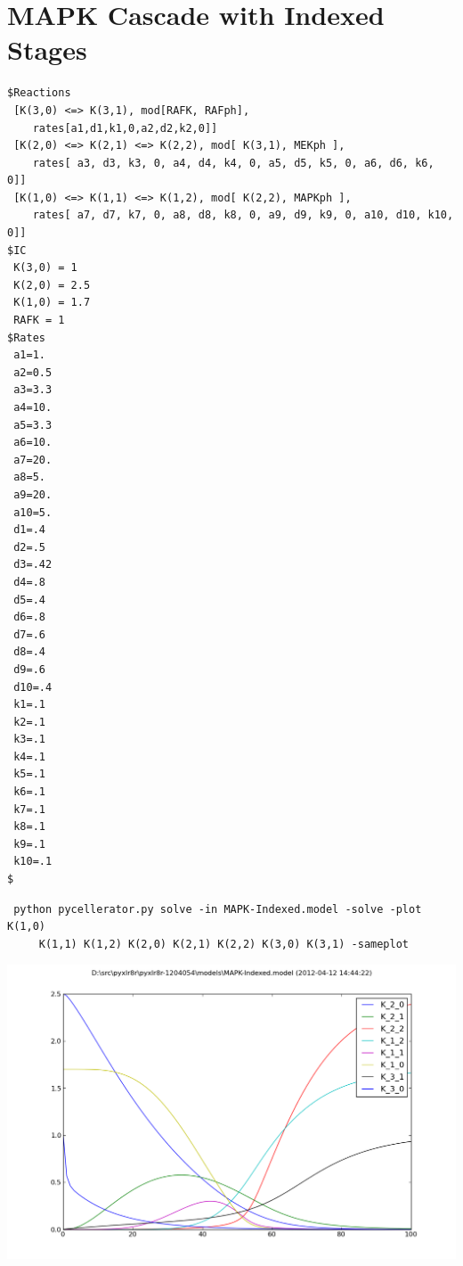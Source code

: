 \section{MAPK Cascade with Indexed Stages}

\begin{lstlisting}
$Reactions
 [K(3,0) <=> K(3,1), mod[RAFK, RAFph], 
    rates[a1,d1,k1,0,a2,d2,k2,0]]
 [K(2,0) <=> K(2,1) <=> K(2,2), mod[ K(3,1), MEKph ], 
    rates[ a3, d3, k3, 0, a4, d4, k4, 0, a5, d5, k5, 0, a6, d6, k6, 0]]
 [K(1,0) <=> K(1,1) <=> K(1,2), mod[ K(2,2), MAPKph ], 
    rates[ a7, d7, k7, 0, a8, d8, k8, 0, a9, d9, k9, 0, a10, d10, k10, 0]]
$IC
 K(3,0) = 1
 K(2,0) = 2.5
 K(1,0) = 1.7
 RAFK = 1
$Rates
 a1=1.
 a2=0.5
 a3=3.3
 a4=10.
 a5=3.3
 a6=10.
 a7=20.
 a8=5.
 a9=20.
 a10=5.
 d1=.4
 d2=.5
 d3=.42
 d4=.8
 d5=.4
 d6=.8
 d7=.6
 d8=.4
 d9=.6
 d10=.4
 k1=.1
 k2=.1
 k3=.1
 k4=.1
 k5=.1
 k6=.1
 k7=.1
 k8=.1
 k9=.1
 k10=.1
$
\end{lstlisting}

\begin{lstlisting}
 python pycellerator.py solve -in MAPK-Indexed.model -solve -plot K(1,0) 
     K(1,1) K(1,2) K(2,0) K(2,1) K(2,2) K(3,0) K(3,1) -sameplot 
\end{lstlisting}
 
\begin{center}
\includegraphics[width=.75\textwidth]{MAPK-Indexed.png}
\end{center}